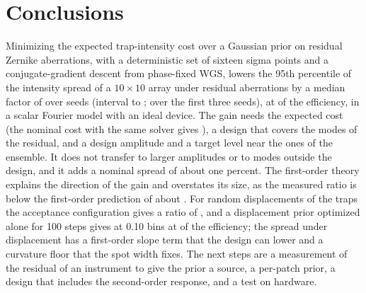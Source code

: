 \section{Conclusions}\label{sec:conclusions}

Minimizing the expected trap-intensity cost over a Gaussian prior on residual Zernike aberrations, with a deterministic set of sixteen sigma points and a conjugate-gradient descent from phase-fixed WGS, lowers the 95th percentile of the intensity spread of a $10\times10$ array under residual aberrations by a median factor of \ratioHeadAll{} over \ratioHeadAllN{} seeds (interval \ratioAllCiLo{} to \ratioAllCiHi; \ratioHeadThree{} over the first three seeds), at \effAllMed{} of the efficiency, in a scalar Fourier model with an ideal device. The gain needs the expected cost (the nominal cost with the same solver gives \ablNominalMed), a design that covers the modes of the residual, and a design amplitude and a target level near the ones of the ensemble. It
does not transfer to larger amplitudes or to modes outside the design, and it adds a nominal spread of about one percent. The first-order theory explains the direction of the gain and overstates its size, as the measured ratio is below the first-order prediction of about \thQLinRatio. For random displacements of the traps the acceptance configuration gives a ratio of \ptAccMed{}, and a displacement prior optimized alone for 100 steps gives \poBLong{} at 0.10 bins at \poBLongEff{} of the efficiency; the spread under displacement has a first-order slope term that the design can lower and a curvature floor that the spot width fixes. The next steps are a measurement of the residual of an instrument to give the prior a source, a per-patch prior, a design that includes the second-order response, and a test on hardware.
